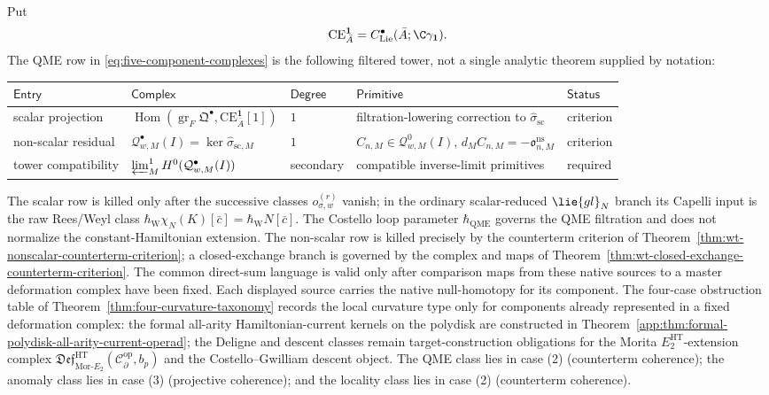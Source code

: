 \begin{thm}
Put
\[
  \mathrm{CE}_{\bar A}^{\mathbf 1}
  =
  C^\bullet_{\mathrm{Lie}}(\bar A;\C\gamma_{\mathbf 1}).
\]
The QME row in \eqref{eq:five-component-complexes} is the following
filtered tower, not a single analytic theorem supplied by notation:
\begin{center}
\scriptsize
\renewcommand{\arraystretch}{1.2}
\begin{tabular}{@{}p{}|p{}|p{}|p{}|p{}@{}}
\(\mathsf{Entry}\) & \(\mathsf{Complex}\) & \(\mathsf{Degree}\) &
\(\mathsf{Primitive}\) & \(\mathsf{Status}\)\\\hline
scalar projection &
\(\operatorname{Hom}(\operatorname{gr}_{F}\mathfrak Q^\bullet,
\mathrm{CE}_{\bar A}^{\mathbf 1}[1])\) &
\(1\) &
filtration-lowering correction to \(\widehat\sigma_{\mathrm{sc}}\) &
criterion\\
non-scalar residual &
\(\mathcal Q^\bullet_{w,M}(I)=\ker\widehat\sigma_{\mathrm{sc},M}\) &
\(1\) &
\(C_{n,M}\in\mathcal Q^0_{w,M}(I)\), \(d_MC_{n,M}=-\mathfrak o^{\mathrm{ns}}_{n,M}\) &
criterion\\
tower compatibility &
\(\varprojlim\nolimits^1_MH^0(\mathcal Q^\bullet_{w,M}(I))\) &
secondary &
compatible inverse-limit primitives &
required
\end{tabular}
\end{center}
The scalar row is killed only after the successive classes
\(o_{\sigma,w}^{(r)}\) vanish; in the ordinary scalar-reduced
\(\lie{gl}_N\) branch its Capelli input is the raw Rees/Weyl class
\(\hbar_{\mathrm W}\chi_N(K)[\bar c]
=\hbar_{\mathrm W}N[\bar c]\).  The Costello loop parameter
\(\hbar_{\mathrm{QME}}\) governs the QME filtration and does not
normalize the constant-Hamiltonian extension.
The non-scalar row is killed precisely by the counterterm criterion of
Theorem~\ref{thm:wt-nonscalar-counterterm-criterion}; a closed-exchange
branch is governed by the complex and maps of
Theorem~\ref{thm:wt-closed-exchange-counterterm-criterion}.
The common direct-sum language is valid only after comparison maps from
these native sources to a master deformation complex have been fixed.
Each displayed source carries the native null-homotopy for its component.
The four-case obstruction table of
Theorem~\ref{thm:four-curvature-taxonomy} records the local curvature type
only for components already represented in a fixed deformation complex:
the formal all-arity Hamiltonian-current kernels on the polydisk are
constructed in
Theorem~\ref{app:thm:formal-polydisk-all-arity-current-operad}; the
Deligne and descent classes remain target-construction obligations
for the Morita \(E_2^{\mathrm{HT}}\)-extension complex
\(\mathfrak{Def}^{\mathrm{HT}}_{\mathrm{Mor}\mbox{-}E_2}
(\mathcal C^{\mathrm{op}}_\partial,b_p)\) and the
Costello--Gwilliam descent object.  The QME class lies in
case (2) (counterterm coherence); the anomaly class lies in case (3)
(projective coherence); and the locality class lies in case (2)
(counterterm coherence).
\end{thm}

